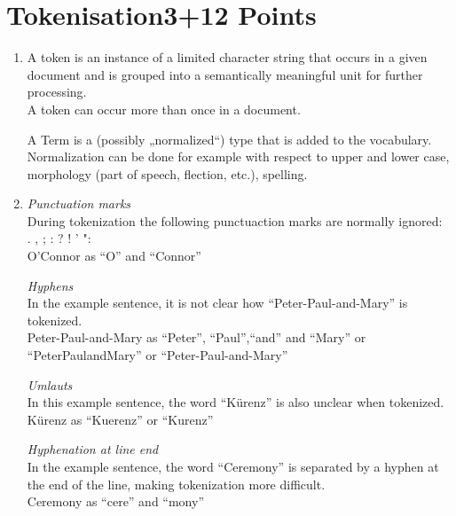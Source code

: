 \documentclass[10pt,a4paper]{article}
\begin{document}
\section{\hfill Tokenisation\hfill 3+12 Points}
\begin{enumerate}
    \item  A token is an instance of a limited character string that occurs in a given document and is grouped into a semantically meaningful unit for further processing.\\
    A token can occur more than once in a document. 
    
    A Term is a (possibly „normalized“) type that is added to the vocabulary. Normalization can be done for example with respect to upper and lower case, morphology (part of speech, flection, etc.), spelling. \\
    
    \item  \textit{Punctuation marks} \\
                 During tokenization the following punctuaction marks are normally ignored: \\
                . , ; : ? ! ' ": \\
                O'Connor as \enquote{O} and \enquote{Connor}
                
           \textit{Hyphens} \\
                In the example sentence, it is not clear how \enquote{Peter-Paul-and-Mary} is tokenized. \\
                Peter-Paul-and-Mary as \enquote{Peter}, \enquote{Paul},\enquote{and} and \enquote{Mary} or \enquote{PeterPaulandMary} or \enquote{Peter-Paul-and-Mary}
                
           \textit{Umlauts}\\
                In this example sentence, the word \enquote{Kürenz} is also unclear when tokenized. \\
                Kürenz as \enquote{Kuerenz} or \enquote{Kurenz}
                
          \textit{Hyphenation at line end} \\
                In the example sentence, the word \enquote{Ceremony} is separated by a hyphen at the end of the line, making tokenization more difficult. \\
                Ceremony as \enquote{cere} and \enquote{mony}
\end{enumerate}  
\end{document}
